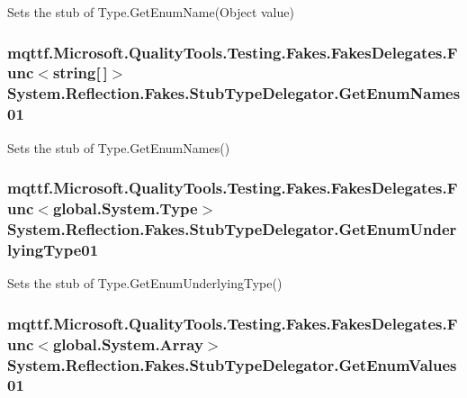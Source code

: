 Sets the stub of Type.\-Get\-Enum\-Name(\-Object value)

\hypertarget{class_system_1_1_reflection_1_1_fakes_1_1_stub_type_delegator_a472ba24cdff1803f6888aaed115319a8}{
\subsubsection[{Get\-Enum\-Names01}]{\setlength{\rightskip}{0pt plus 5cm}mqttf.\-Microsoft.\-Quality\-Tools.\-Testing.\-Fakes.\-Fakes\-Delegates.\-Func$<$string\mbox{[}$\,$\mbox{]}$>$ System.\-Reflection.\-Fakes.\-Stub\-Type\-Delegator.\-Get\-Enum\-Names01}}\label{class_system_1_1_reflection_1_1_fakes_1_1_stub_type_delegator_a472ba24cdff1803f6888aaed115319a8}


Sets the stub of Type.\-Get\-Enum\-Names()

\hypertarget{class_system_1_1_reflection_1_1_fakes_1_1_stub_type_delegator_a2ca084ffcc1f87e31e3c88555f5e9ebb}{
\subsubsection[{Get\-Enum\-Underlying\-Type01}]{\setlength{\rightskip}{0pt plus 5cm}mqttf.\-Microsoft.\-Quality\-Tools.\-Testing.\-Fakes.\-Fakes\-Delegates.\-Func$<$global.\-System.\-Type$>$ System.\-Reflection.\-Fakes.\-Stub\-Type\-Delegator.\-Get\-Enum\-Underlying\-Type01}}\label{class_system_1_1_reflection_1_1_fakes_1_1_stub_type_delegator_a2ca084ffcc1f87e31e3c88555f5e9ebb}


Sets the stub of Type.\-Get\-Enum\-Underlying\-Type()

\hypertarget{class_system_1_1_reflection_1_1_fakes_1_1_stub_type_delegator_af73c117b199485045755603ce52605f1}{
\subsubsection[{Get\-Enum\-Values01}]{\setlength{\rightskip}{0pt plus 5cm}mqttf.\-Microsoft.\-Quality\-Tools.\-Testing.\-Fakes.\-Fakes\-Delegates.\-Func$<$global.\-System.\-Array$>$ System.\-Reflection.\-Fakes.\-Stub\-Type\-Delegator.\-Get\-Enum\-Values01}}\label{class_system_1_1_reflection_1_1_fakes_1_1_stub_type_delegator_af73c117b199485045755603ce52605f1}


